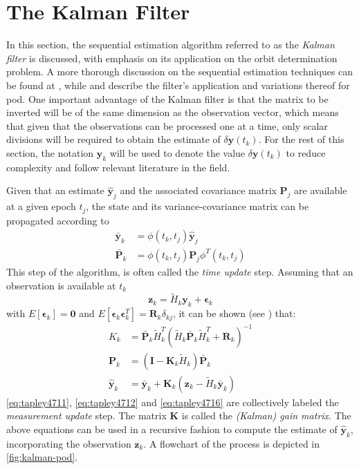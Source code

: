 \section{The Kalman Filter}\label{sec:pod-kalman-filter}

In this section, the sequential estimation algorithm referred to as the 
\emph{Kalman filter} is discussed, with emphasis on its application on the orbit 
determination problem. A more thorough discussion on the sequential estimation 
techniques can be found at \cite{Gelb1974}, while \cite{Montenbruck2000} and 
\cite{Tapley2004} describe the filter's application and variations thereof for 
\gls{pod}. One important advantage of the Kalman filter is that the matrix to be 
inverted will be of the same dimension as the observation vector, which means 
that given that the observations can be processed one at a time, only scalar 
divisions will be required to obtain the estimate of $\delta \bm{y}(t_k)$. For the 
rest of this section, the notation $\bm{y}_k$ will be used to denote the value 
$\delta \bm{y}(t_k)$ to reduce complexity and follow relevant literature in the 
field.

Given that an estimate $\hat{\bm{y}}_j$ and the associated covariance matrix $\bm{P}_j$ 
are available at a given epoch $t_j$, the state and its variance-covariance matrix can 
be propagated according to
\begin{equation}\label{eq:tapley471}
    \begin{aligned}
        \bar{\bm{y}}_k &= \phi (t_k, t_j) \hat{\bm{y}}_j \\
        \bar{\bm{P}}_k &= \phi (t_k, t_j) \bm{P}_j \phi ^{T}(t_k, t_j)
    \end{aligned}
\end{equation}
This step of the algorithm, is often called the \emph{time update} step. 
Assuming that an observation is available at $t_k$
\begin{equation}\label{eq:tapley472}
    \bm{z}_k = \tilde{H}_k \bm{y}_k + \bm{\epsilon}_k
\end{equation}
with $E [\bm{\epsilon}_k] = \bm{0}$ and  
$E [\bm{\epsilon}_k \bm{\epsilon}^{T}_k] = \bm{R}_k \delta _{kj}$, it can be 
shown (see \cite{Tapley2004}) that:
\begin{align}
    K_k &= \bar{\bm{P}}_k \tilde{H}^{T}_{k} 
        \left( \tilde{H}_{k} \bar{\bm{P}}_k \tilde{H}^{T}_{k} 
            + \bm{R}_k \right)^{-1} \label{eq:tapley4711} \\
    \bm{P}_k &= \left( \bm{I} - \bm{K}_k \tilde{H}_{k} \right) \bar{\bm{P}}_k 
        \label{eq:tapley4712} \\
    \hat{\bm{y}}_k &= \bar{\bm{y}}_k + \bm{K}_k 
        \left( \bm{z}_k - \tilde{H}_{k} \bar{\bm{y}}_k \right) \label{eq:tapley4716}
\end{align}
\autoref{eq:tapley4711}, \autoref{eq:tapley4712} and \autoref{eq:tapley4716} are 
collectively labeled the \emph{measurement update} step. The matrix $\bm{K}$ is 
called the \emph{(Kalman) gain matrix}.
The above equations can be used in a recursive fashion to compute the estimate of 
$\hat{\bm{y}}_k$, incorporating the observation $\bm{z}_k$. A flowchart of the 
process is depicted in \autoref{fig:kalman-pod}.

